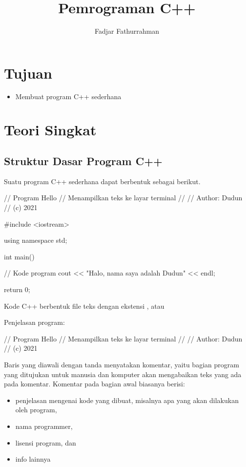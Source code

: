 \documentclass[a4paper,11pt,bahasa]{article} %
\begin{document}
\title{Pemrograman C++}
\author{Fadjar Fathurrahman}
\date{}
\maketitle

\section{Tujuan}

\begin{itemize}
\item Membuat program C++ sederhana
\end{itemize}



\section{Teori Singkat}


\subsection{Struktur Dasar Program C++}

Suatu program C++ sederhana dapat berbentuk sebagai berikut.
\begin{cppcode}
// Program Hello
// Menampilkan teks ke layar terminal
// 
// Author: Dudun
// (c) 2021

#include <iostream>

using namespace std;

int main()
{
  // Kode program
  cout << "Halo, nama saya adalah Dudun" << endl;

  return 0;
}
\end{cppcode}

Kode C++ berbentuk file teks dengan ekstensi ,
 atau 

Penjelasan program:

\begin{cppcode}
// Program Hello
// Menampilkan teks ke layar terminal
// 
// Author: Dudun
// (c) 2021
\end{cppcode}
Baris yang diawali dengan tanda \txtinline{//} menyatakan komentar, yaitu bagian
program yang ditujukan untuk manusia dan komputer akan mengabaikan teks yang ada
pada komentar. Komentar pada bagian awal biasanya berisi:
\begin{itemize}
\item penjelasan mengenai kode yang dibuat, misalnya apa yang akan dilakukan oleh
    program,
\item nama programmer,
\item lisensi program, dan
\item info lainnya
\end{itemize}
\end{document}

